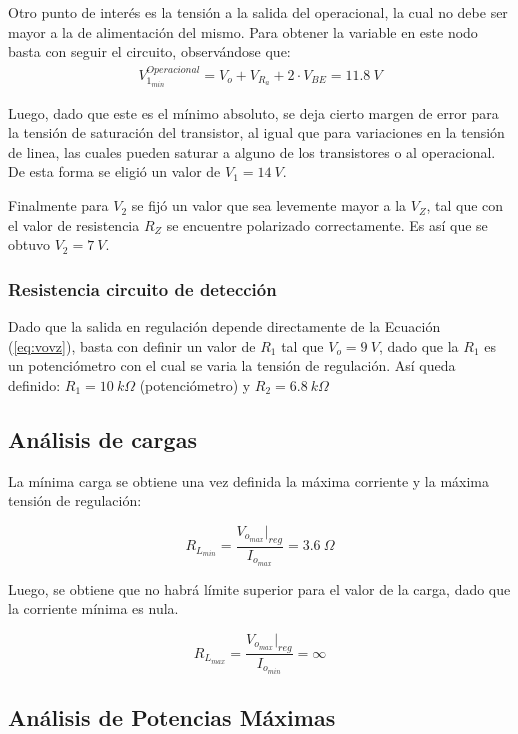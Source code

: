 Otro punto de interés es la tensión a la salida del operacional, la cual no debe ser mayor a la de alimentación del mismo. Para obtener la variable en este nodo basta con seguir el circuito, observándose que:
\begin{align}
V_{1_{min}}^{Operacional}= V_o+V_{R_a}+2\cdot V_{BE} = 11.8 \ V
\end{align}

Luego, dado que este es el mínimo absoluto, se deja cierto margen de error para la tensión de saturación del transistor, al igual que para variaciones en la tensión de linea, las cuales pueden saturar a alguno de los transistores o al operacional. De esta forma se eligió un valor de $V_1=14 \ V$.

Finalmente para $V_2$ se fijó un valor que sea levemente mayor a la $V_Z$, tal que con el valor de resistencia $R_Z$ se encuentre polarizado correctamente. Es así que se obtuvo $V_2=7 \ V$.

\subsubsection{Resistencia circuito de detección}
\label{sec:resdet}
Dado que la salida en regulación depende directamente de la Ecuación (\ref{eq:vovz}), basta con definir un valor de $R_1$ tal que $V_o=9 \ V$, dado que la $R_1$ es un potenciómetro con el cual se varia la tensión de regulación. Así queda definido: $R_1= 10 \ k\Omega$ (potenciómetro) y $R_2=6.8  \  k\Omega$

\subsection{Análisis de cargas}
La mínima carga se obtiene una vez definida la máxima corriente y la máxima tensión de regulación:

\begin{equation}
	R_{L_{min}} = \frac{{V_{o_{max}}}|_{reg}}{I_{o_{max}}} = 3.6 \ \Omega
\end{equation}

Luego, se obtiene que no habrá límite superior para el valor de la carga, dado que la corriente mínima es nula.

\begin{equation}
	R_{L_{max}} = \frac{{V_{o_{max}}}|_{reg}}{I_{o_{min}}} = \infty
\end{equation}

\subsection{Análisis de Potencias Máximas}

